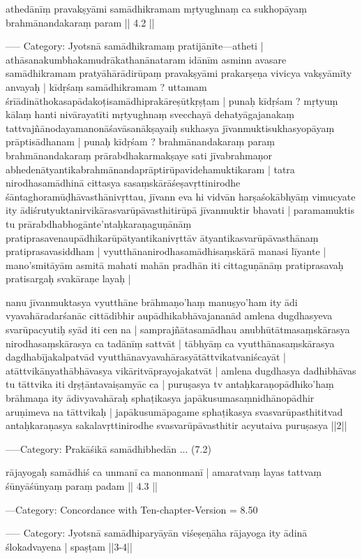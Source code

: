 \documentclass[12pt]{article}
\begin{document}
\begin{otherlanguage}{iast}
\begin{ekdosis}
\begin{ekdverse}
athedānīṃ pravakṣyāmi samādhikramam %
mṛtyughnaṃ ca sukhopāyaṃ brahmānandakaraṃ param  || 4.2 ||

—– Category: Jyotsnā
samādhikramaṃ pratijānīte—atheti | athāsanakumbhakamudrākathanānataram
idānīm asminn avasare samādhikramam pratyāhārādirūpaṃ pravakṣyāmi prakarṣeṇa vivicya vakṣyāmīty
anvayaḥ | kīdṛśaṃ samādhikramam ? uttamam śrīādināthokasapādakoṭisamādhiprakāreṣūtkṛṣṭam |
punaḥ kīdṛśam ? mṛtyuṃ kālaṃ hanti nivārayatīti mṛtyughnaṃ svecchayā dehatyāgajanakaṃ
tattvajñānodayamanonāśavāsanākṣayaiḥ sukhasya jīvanmuktisukhasyopāyaṃ prāptisādhanam | punaḥ
kīdṛśam ? brahmānandakaraṃ paraṃ brahmānandakaraṃ prārabdhakarmakṣaye sati jīvabrahmaṇor
abhedenātyantikabrahmānandaprāptirūpavidehamuktikaram | tatra nirodhasamādhinā cittasya
sasaṃskārāśeṣavṛttinirodhe śāntaghoramūḍhāvasthānivṛttau, jīvann eva hi vidvān
harṣaśokābhyāṃ vimucyate ity ādiśrutyuktanirvikārasvarūpāvasthitirūpā jīvanmuktir bhavati |
paramamuktis tu prārabdhabhogānte'ntaḥkaraṇaguṇānāṃ pratiprasavenaupādhikarūpātyantikanivṛttāv
ātyantikasvarūpāvasthānaṃ pratiprasavasiddham | vyutthānanirodhasamādhisaṃskārā manasi līyante
| mano'smitāyām asmitā mahati mahān pradhān iti cittaguṇānāṃ pratiprasavaḥ pratisargaḥ svakāraṇe
layaḥ |

nanu jīvanmuktasya vyutthāne brāhmaṇo'haṃ manuṣyo'ham ity ādi vyavahāradarśanāc cittādibhir
aupādhikabhāvajananād amlena dugdhasyeva svarūpacyutiḥ syād iti cen na | samprajñātasamādhau
anubhūtātmasaṃskārasya nirodhasaṃskārasya ca tadānīṃ sattvāt | tābhyāṃ ca vyutthānasaṃskārasya
dagdhabījakalpatvād vyutthānavyavahārasyātāttvikatvaniścayāt | atāttvikānyathābhāvasya
vikāritvāprayojakatvāt | amlena dugdhasya dadhibhāvas tu tāttvika iti dṛṣṭāntavaiṣamyāc ca |
puruṣasya tv antaḥkaraṇopādhiko'haṃ brāhmaṇa ity ādivyavahāraḥ sphaṭikasya
japākusumasaṃnidhānopādhir aruṇimeva na tāttvikaḥ | japākusumāpagame sphaṭikasya
svasvarūpasthititvad antaḥkaraṇasya sakalavṛttinirodhe svasvarūpāvasthitir acyutaiva
puruṣasya ||2||

—–Category: Prakāśikā
samādhibhedān ... (7.2)




rājayogaḥ samādhiś ca unmanī ca manonmanī  |
amaratvaṃ layas tattvaṃ śūnyāśūnyaṃ paraṃ padam  || 4.3 ||

—Category: Concordance with Ten-chapter-Version    = 8.50

—– Category: Jyotsnā
samādhiparyāyān viśeṣeṇāha  rājayoga ity ādinā ślokadvayena | spaṣṭam ||3-4||


\end{ekdverse}
\end{ekdosis}
\end{otherlanguage}
\end{document}
